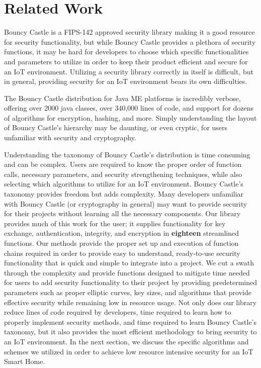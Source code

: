 \section{Related Work}

Bouncy Castle is a FIPS-142 approved security library making it a good resource for security functionality, but while Bouncy Castle provides a plethora of security functions, it may be hard for developers to choose which specific functionalities and parameters to utilize in order to keep their product efficient and secure for an IoT environment. \cite{bc} Utilizing a security library correctly in itself is difficult, but in general, providing security for an IoT environment bears its own difficulties. 

The Bouncy Castle distribution for Java ME platforms is incredibly verbose, offering over 2000 java classes, over 340,000 lines of code, and support for dozens of algorithms for encryption, hashing, and more. Simply understanding the layout of Bouncy Castle's hierarchy may be daunting, or even cryptic, for users unfamiliar with security and cryptography. 

Understanding the taxonomy of Bouncy Castle's distribution is time consuming and can be complex. Users are required to know the proper order of function calls, necessary parameters, and security strengthening techniques, while also selecting which algorithms to utilize for an IoT environment. Bouncy Castle's taxonomy provides freedom but adds complexity. Many developers unfamiliar with Bouncy Castle (or cryptography in general) may want to provide security for their projects without learning all the necessary components. Our library provides much of this work for the user; it supplies functionality for key exchange, authentication, integrity, and encryption in {\bf eighteen} streamlined functions. Our methods provide the proper set up and execution of function chains required in order to provide easy to understand, ready-to-use security functionality that is quick and simple to integrate into a project. We cut a swath through the complexity and provide functions designed to mitigate time needed for users to add security functionality to their project by providing predetermined parameters such as proper elliptic curves, key sizes, and algorithms that provide effective security while remaining low in resource usage. Not only does our library reduce lines of code required by developers, time required to learn how to properly implement security methods, and time required to learn Bouncy Castle's taxonomy, but it also provides the most efficient methodology to bring security to an IoT environment. In the next section, we discuss the specific algorithms and schemes we utilized in order to achieve low resource intensive security for an IoT Smart Home.



